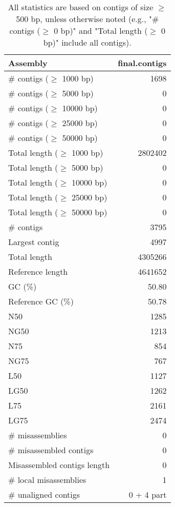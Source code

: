 \documentclass[12pt,a4paper]{article}
\begin{document}
\begin{table}[ht]
\begin{center}
\caption{All statistics are based on contigs of size $\geq$ 500 bp, unless otherwise noted (e.g., "\# contigs ($\geq$ 0 bp)" and "Total length ($\geq$ 0 bp)" include all contigs).}
\begin{tabular}{|l*{1}{|r}|}
\hline
Assembly & final.contigs \\ \hline
\# contigs ($\geq$ 1000 bp) & 1698 \\ \hline
\# contigs ($\geq$ 5000 bp) & 0 \\ \hline
\# contigs ($\geq$ 10000 bp) & 0 \\ \hline
\# contigs ($\geq$ 25000 bp) & 0 \\ \hline
\# contigs ($\geq$ 50000 bp) & 0 \\ \hline
Total length ($\geq$ 1000 bp) & 2802402 \\ \hline
Total length ($\geq$ 5000 bp) & 0 \\ \hline
Total length ($\geq$ 10000 bp) & 0 \\ \hline
Total length ($\geq$ 25000 bp) & 0 \\ \hline
Total length ($\geq$ 50000 bp) & 0 \\ \hline
\# contigs & 3795 \\ \hline
Largest contig & 4997 \\ \hline
Total length & 4305266 \\ \hline
Reference length & 4641652 \\ \hline
GC (\%) & 50.80 \\ \hline
Reference GC (\%) & 50.78 \\ \hline
N50 & 1285 \\ \hline
NG50 & 1213 \\ \hline
N75 & 854 \\ \hline
NG75 & 767 \\ \hline
L50 & 1127 \\ \hline
LG50 & 1262 \\ \hline
L75 & 2161 \\ \hline
LG75 & 2474 \\ \hline
\# misassemblies & 0 \\ \hline
\# misassembled contigs & 0 \\ \hline
Misassembled contigs length & 0 \\ \hline
\# local misassemblies & 1 \\ \hline
\# unaligned contigs & 0 + 4 part \\ \hline

\end{tabular}
\end{center}
\end{table}
\end{document}
